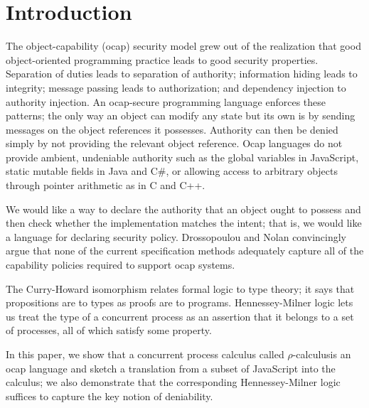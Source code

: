 \documentclass[]{amsart}
\theoremstyle{definition}
\theoremstyle{remark}
\numberwithin{equation}{subsection}
\newcommand{\rhoc}{$\rho$-calculus}
\newcommand{\paperversion}{Draft Version 0.1 - July 19, 2013}
\newenvironment{toc}
{
\begin{list}{}{
   \setlength{\leftmargin}{0.4in}
   \setlength{\rightmargin}{0.6in}
   \setlength{\parskip}{0pt}
 } \item }
{\end{list}}
\begin{document}



\section{Introduction}

The object-capability (ocap) security model grew out of the realization
that good object-oriented programming practice leads to good security properties.
Separation of duties leads to separation of authority; information hiding
leads to integrity; message passing leads to authorization; 
and dependency injection to authority injection.  An
ocap-secure programming language enforces these patterns; the only way an
object can modify any state but its own is by sending messages on the object
references it possesses.  Authority can then be denied simply by not providing
the relevant object reference. Ocap languages do not provide ambient, undeniable 
authority such as the global variables in JavaScript,
static mutable fields in Java and C#, or allowing access to arbitrary objects
through pointer arithmetic as in C and C++.  

We would like a way to declare the authority that an object ought to
possess and then check whether the implementation matches the intent; that is,
we would like a language for declaring security policy.
Drossopoulou and Nolan \cite{Drossopoulou} convincingly argue that none 
of the current specification methods adequately capture all of the capability 
policies required to support ocap systems.

The Curry-Howard isomorphism relates formal logic to type theory; it says 
that propositions are to types as proofs are to programs.  Hennessey-Milner
logic lets us treat the type of a concurrent process as an assertion that 
it belongs to a set of processes, all of which satisfy some property.  

In this paper, we show that a concurrent process calculus called \rhoc is
an ocap language and sketch a translation from a subset of JavaScript into
the calculus; we also demonstrate that the corresponding Hennessey-Milner
logic suffices to capture the key notion of deniability.
\end{document}
